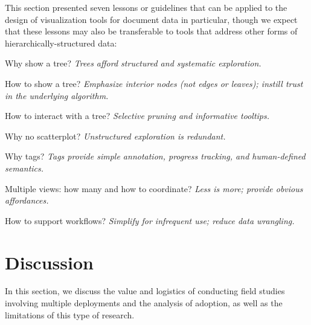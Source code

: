 This section presented seven lessons or guidelines that can be applied to the design of visualization tools for document data in particular, though we expect that these lessons may also be transferable to tools that address other forms of hierarchically-structured data:

\begin{itemize}
    \item Why show a tree? {\it Trees afford structured and systematic exploration.}
    \item How to show a tree? {\it Emphasize interior nodes (not edges or leaves); instill trust in the underlying algorithm.}
    \begin{sloppypar}
    \item How to interact with a tree? {\it Selective pruning and informative tooltips.}
    \end{sloppypar}
    \item Why no scatterplot? {\it Unstructured exploration is redundant.}
    \item Why tags? {\it Tags provide simple annotation, progress tracking, and human-defined semantics.}
    \item Multiple views: how many and how to coordinate? {\it Less is more; provide obvious affordances.}
    \item How to support workflows? {\it Simplify for infrequent use; reduce data wrangling.}
\end{itemize}


\section{Discussion}
\label{overview:discussion}


In this section, we discuss the value and logistics of conducting field studies involving multiple deployments and the analysis of adoption, as well as the limitations of this type of research.

